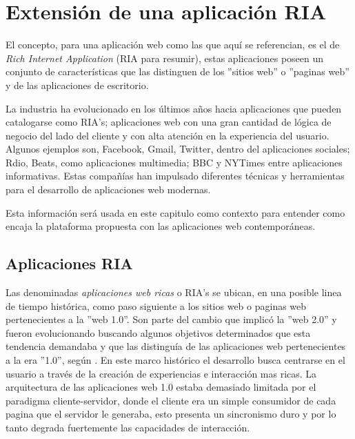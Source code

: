 
\chapter{Extensi\'{o}n de una aplicaci\'{o}n RIA} %

\label{ch:ria_extension} 

El concepto, para una aplicación web como las que aquí se referencian, es el de \emph{Rich Internet Application} (RIA para resumir), estas aplicaciones poseen un conjunto de características que las distinguen de los ''sitios web'' o ''paginas web'' y de las aplicaciones de escritorio. 

La industria ha evolucionado en los últimos años hacia aplicaciones que pueden catalogarse como RIA's; aplicaciones web con una gran cantidad de lógica de negocio del lado del cliente y con alta atención en la experiencia del usuario. Algunos ejemplos son, Facebook, Gmail, Twitter, dentro del aplicaciones sociales; Rdio, Beats, como aplicaciones multimedia; BBC y NYTimes entre aplicaciones informativas. Estas compañías han impulsado diferentes técnicas y herramientas para el desarrollo de aplicaciones web modernas. 

Esta información será usada en este capitulo como contexto para entender como encaja la plataforma propuesta con las aplicaciones web contemporáneas.

\section{Aplicaciones RIA} \label{sec:extension_ria_intro}

Las denominadas \emph{aplicaciones web ricas} o RIA's se ubican, en una posible linea de tiempo histórica, como paso siguiente a los sitios web o paginas web pertenecientes a la ''web 1.0''. Son parte del cambio que implicó la ''web 2.0'' y fueron evolucionando buscando algunos objetivos determinados que esta tendencia demandaba y que las distinguía de las aplicaciones web pertenecientes a la era ''1.0'', según \citet{Farrell2007}. En este marco histórico el desarrollo busca centrarse en el usuario a través de la creación de experiencias e interacción mas ricas. La arquitectura de las aplicaciones web 1.0 estaba demasiado limitada por el paradigma cliente-servidor, donde el cliente era un simple consumidor de cada pagina que el servidor le generaba, esto presenta un sincronismo duro y por lo tanto degrada fuertemente las capacidades de interacción.

